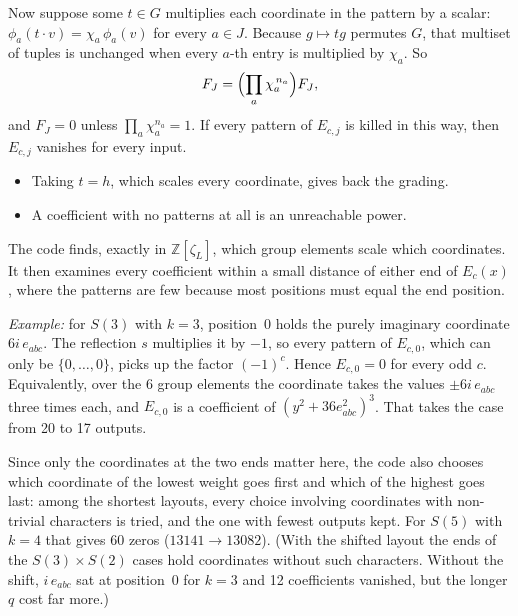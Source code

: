 \documentclass[11pt]{article}
\theoremstyle{definition}
\theoremstyle{remark}
\begin{document}
Now suppose some $t \in G$ multiplies each coordinate in the pattern by a
scalar: $\phi_a(t \cdot v) = \chi_a\, \phi_a(v)$ for every $a \in J$. Because
$g \mapsto tg$ permutes $G$, that multiset of tuples is unchanged when every
$a$-th entry is multiplied by $\chi_a$. So
\[
  F_J = \Bigl(\prod_{a} \chi_a^{\,n_a}\Bigr) F_J ,
\]
and $F_J = 0$ unless $\prod_a \chi_a^{n_a} = 1$. If every pattern of $E_{c,j}$
is killed in this way, then $E_{c,j}$ vanishes for every input.
\begin{itemize}
  \item Taking $t = h$, which scales every coordinate, gives back the grading.
  \item A coefficient with no patterns at all is an unreachable power.
\end{itemize}
The code finds, exactly in $\mathbb{Z}[\zeta_L]$, which group elements scale
which coordinates. It then examines every coefficient within a small distance of
either end of $E_c(x)$, where the patterns are few because most positions must
equal the end position.

\emph{Example:} for $S(3)$ with $k = 3$, position~0 holds the purely
imaginary coordinate $6i\,e_{abc}$. The reflection $s$ multiplies it by $-1$,
so every pattern of $E_{c,0}$, which can only be $\{0, \ldots, 0\}$, picks up
the factor $(-1)^c$. Hence $E_{c,0} = 0$ for every odd $c$. Equivalently, over
the 6 group elements the coordinate takes the values $\pm 6i\,e_{abc}$ three
times each, and $E_{c,0}$ is a coefficient of $(y^2 + 36e_{abc}^2)^3$. That
takes the case from 20 to 17 outputs.

Since only the coordinates at the two ends matter here, the code also chooses
which coordinate of the lowest weight goes first and which of the highest goes
last: among the shortest layouts, every choice involving coordinates with
non-trivial characters is tried, and the one with fewest outputs kept. For
$S(5)$ with $k = 4$ that gives 60 zeros ($13141 \to 13082$). (With the shifted
layout the ends of the $S(3)\times S(2)$ cases hold coordinates without such
characters. Without the shift, $i\,e_{abc}$ sat at position~0 for $k = 3$ and
12 coefficients vanished, but the longer $q$ cost far more.)
\end{document}
